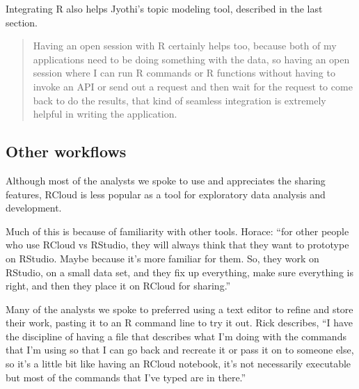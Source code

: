 Integrating R also helps Jyothi's topic modeling tool, described in the last section.
\begin{quote}
Having an open session with R certainly helps too, because both of my
applications need to be doing something with the data, so having an open session
where I can run R commands or R functions without having to invoke an API or
send out a request and then wait for the request to come back to do the results,
that kind of seamless integration is extremely helpful in writing the
application.
\end{quote}




\subsection{Other workflows}

Although most of the analysts we spoke to use and appreciates the sharing
features, RCloud is less popular as a tool for exploratory data analysis and
development.

Much of this is because of familiarity with other tools. Horace: ``for other
people who use RCloud vs RStudio, they will always think that they want to
prototype on RStudio. Maybe because it's more familiar for them. So, they work
on RStudio, on a small data set, and they fix up everything, make sure
everything is right, and then they place it on RCloud for sharing.''

Many of the analysts we spoke to preferred using a text editor to refine and
store their work, pasting it to an R command line to try it out. Rick describes,
``I have the discipline of having a file that describes what I'm doing with the
commands that I'm using so that I can go back and recreate it or pass it on to
someone else, so it's a little bit like having an RCloud notebook, it's not
necessarily executable but most of the commands that I've typed are in there.''

